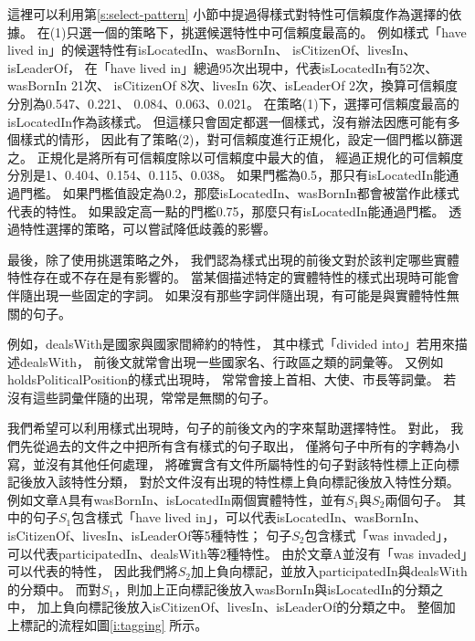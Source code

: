 這裡可以利用第\ref{s:select-pattern} 小節中提過得樣式對特性可信賴度作為選擇的依據。
在(1)只選一個的策略下，挑選候選特性中可信賴度最高的。
例如樣式「have lived in」的候選特性有isLocatedIn、wasBornIn、
isCitizenOf、livesIn、isLeaderOf，
在「have lived in」總過95次出現中，代表isLocatedIn有52次、wasBornIn 21次、
isCitizenOf 8次、livesIn 6次、isLeaderOf 2次，換算可信賴度分別為0.547、0.221、
0.084、0.063、0.021。
在策略(1)下，選擇可信賴度最高的isLocatedIn作為該樣式。
但這樣只會固定都選一個樣式，沒有辦法因應可能有多個樣式的情形，
因此有了策略(2)，對可信賴度進行正規化，設定一個門檻以篩選之。
正規化是將所有可信賴度除以可信賴度中最大的值，
經過正規化的可信賴度分別是1、0.404、0.154、0.115、0.038。
如果門檻為0.5，那只有isLocatedIn能通過門檻。
如果門檻值設定為0.2，那麼isLocatedIn、wasBornIn都會被當作此樣式代表的特性。
如果設定高一點的門檻0.75，那麼只有isLocatedIn能通過門檻。
透過特性選擇的策略，可以嘗試降低歧義的影響。

最後，除了使用挑選策略之外，
我們認為樣式出現的前後文對於該判定哪些實體特性存在或不存在是有影響的。
當某個描述特定的實體特性的樣式出現時可能會伴隨出現一些固定的字詞。
如果沒有那些字詞伴隨出現，有可能是與實體特性無關的句子。

例如，dealsWith是國家與國家間締約的特性，
其中樣式「divided into」若用來描述dealsWith，
前後文就常會出現一些國家名、行政區之類的詞彙等。
又例如holdsPoliticalPosition的樣式出現時，
常常會接上首相、大使、市長等詞彙。
若沒有這些詞彙伴隨的出現，常常是無關的句子。


我們希望可以利用樣式出現時，句子的前後文內的字來幫助選擇特性。
對此，
我們先從過去的文件之中把所有含有樣式的句子取出，
僅將句子中所有的字轉為小寫，並沒有其他任何處理，
將確實含有文件所屬特性的句子對該特性標上正向標記後放入該特性分類，
對於文件沒有出現的特性標上負向標記後放入特性分類。
例如文章A具有wasBornIn、isLocatedIn兩個實體特性，並有$S_1$與$S_2$兩個句子。
其中的句子$S_1$包含樣式「have lived in」，可以代表isLocatedIn、wasBornIn、
isCitizenOf、livesIn、isLeaderOf等5種特性；
句子$S_2$包含樣式「was invaded」，可以代表participatedIn、dealsWith等2種特性。
由於文章A並沒有「was invaded」可以代表的特性，
因此我們將$S_2$加上負向標記，並放入participatedIn與dealsWith的分類中。
而對$S_1$，則加上正向標記後放入wasBornIn與isLocatedIn的分類之中，
加上負向標記後放入isCitizenOf、livesIn、isLeaderOf的分類之中。
整個加上標記的流程如圖\ref{i:tagging} 所示。

